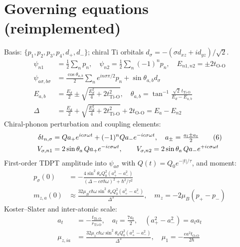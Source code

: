 \documentclass[11pt]{article}
\begin{document}
\section{Governing equations (reimplemented)}
Basis: $\{p_1,p_2,p_3,p_4,d_+,d_-\}$; chiral Ti orbitals
$d_\sigma=-(\sigma d_{xz}+id_{yz})/\sqrt2$.
\begin{align}
\psi_{n1}&=\tfrac12\textstyle\sum_n p_n,\quad
\psi_{n2}=\tfrac12\textstyle\sum_n(-1)^n p_n,\quad E_{n1,n2}=\pm2t_{\mathrm{O\text{-}O}} \tag{1}\\
\psi_{a\sigma,b\sigma}&=\tfrac{\cos\theta_{a,b}}{2}\textstyle\sum_n e^{in\sigma\pi/2}p_n+\sin\theta_{a,b}d_\sigma \tag{2}\\
E_{a,b}&=\tfrac{E_d}{2}\pm\sqrt{\tfrac{E_d^2}{4}+2t_{\mathrm{Ti\text{-}O}}^2},\quad
\theta_{a,b}=\tan^{-1}\tfrac{\sqrt2\,t_{\mathrm{Ti\text{-}O}}}{E_d-E_{a,b}} \tag{3}\\
\Delta&=\tfrac{E_d}{2}+\sqrt{\tfrac{E_d^2}{4}+2t_{\mathrm{Ti\text{-}O}}^2}+2t_{\mathrm{O\text{-}O}}=E_a-E_{n2} \tag{4}
\end{align}
Chiral-phonon perturbation and coupling elements:
\begin{align}
\delta t_{n,\sigma}&=Qa_+e^{ic\sigma\omega t}+(-1)^nQa_-e^{-ic\sigma\omega t},\quad a_\pm=\tfrac{a_l\pm a_t}{2} \tag{6}\\
V_{\sigma,n1}&=2\sin\theta_a\,Qa_+e^{-ic\sigma\omega t},\qquad
V_{\sigma,n2}=2\sin\theta_a\,Qa_-e^{+ic\sigma\omega t} \notag
\end{align}
First-order TDPT amplitude into $\psi_{a\sigma}$ with $Q(t)=Q_0e^{-|t|/\tau}$, and moment:
\begin{align}
p_\sigma(0)&=-\frac{4\sin^2\theta_a Q_0^2(a_+^2-a_-^2)}{(\Delta-c\sigma\hbar\omega)^2+\hbar^2/\tau^2} \tag{7}\\
m_{z,a}(0)&\approx\frac{32\mu_B c\hbar\omega\sin^2\theta_a Q_0^2(a_+^2-a_-^2)}{\Delta^3},\quad m_z=-2\mu_B(p_+-p_-) \tag{8}
\end{align}
Koster--Slater and inter-atomic scale:
\begin{align}
a_t&=-\tfrac{t_{\mathrm{Ti\text{-}O}}}{r_{\mathrm{Ti\text{-}O}}},\quad a_l=\tfrac{7a_t}{2},\quad
(a_+^2-a_-^2)=a_l a_t \tag{10,11}\\
\mu_{z,ia}&=\frac{32\mu_1 c\hbar\omega\sin^2\theta_a Q_0^2(a_+^2-a_-^2)}{\Delta^3},\quad
\mu_1=-\tfrac{ea^2t_{\mathrm{O\text{-}O}}}{2\hbar} \tag{18}
\end{align}
\end{document}
